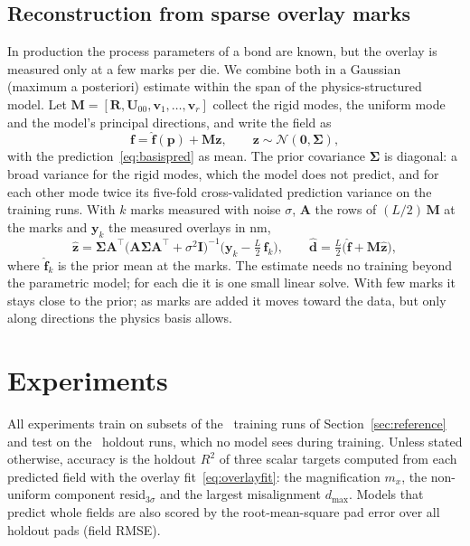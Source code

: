 \documentclass[11pt]{article}
\begin{document}
\subsection{Reconstruction from sparse overlay marks}\label{sec:marks}
In production the process parameters of a bond are known, but the overlay is measured only at a few marks per die. We
combine both in a Gaussian (maximum a posteriori) estimate within the span of the physics-structured model. Let
$\mathbf{M}=[\mathbf{R},\mathbf{U}_{00},\mathbf{v}_1,\dots,\mathbf{v}_r]$ collect the rigid modes, the uniform mode and the
model's principal directions, and write the field as
\begin{equation}
  \mathbf{f} = \hat{\mathbf{f}}(\mathbf{p}) + \mathbf{M}\mathbf{z},\qquad \mathbf{z}\sim\mathcal{N}(\mathbf{0},\boldsymbol\Sigma),
\end{equation}
with the prediction~\eqref{eq:basispred} as mean. The prior covariance $\boldsymbol\Sigma$ is diagonal: a broad
variance for the rigid modes, which the model does not predict, and for each other mode twice its five-fold
cross-validated prediction variance on the training runs. With $k$ marks measured with noise $\sigma$, $\mathbf{A}$ the
rows of $(L/2)\,\mathbf{M}$ at the marks and $\mathbf{y}_k$ the measured overlays in nm,
\begin{equation}\label{eq:map}
  \hat{\mathbf{z}} = \boldsymbol\Sigma\mathbf{A}^{\top}\bigl(\mathbf{A}\boldsymbol\Sigma\mathbf{A}^{\top}+\sigma^2\mathbf{I}\bigr)^{-1}
                     \bigl(\mathbf{y}_k-\tfrac{L}{2}\,\hat{\mathbf{f}}_k\bigr),\qquad
  \hat{\mathbf{d}} = \tfrac{L}{2}\bigl(\hat{\mathbf{f}}+\mathbf{M}\hat{\mathbf{z}}\bigr),
\end{equation}
where $\hat{\mathbf{f}}_k$ is the prior mean at the marks. The estimate needs no training beyond the parametric model;
for each die it is one small linear solve. With few marks it stays close to the prior; as marks are added it moves
toward the data, but only along directions the physics basis allows.

\section{Experiments}\label{sec:experiments}
All experiments train on subsets of the \NTrainRuns~training runs of Section~\ref{sec:reference} and test on the
\NHoldoutRuns~holdout runs, which no model sees during training. Unless stated otherwise, accuracy is the holdout $R^2$
of three scalar targets computed from each predicted field with the overlay fit~\eqref{eq:overlayfit}: the
magnification $m_x$, the non-uniform component $\mathrm{resid}_{3\sigma}$ and the largest misalignment $d_{\max}$.
Models that predict whole fields are also scored by the root-mean-square pad error over all holdout pads (field RMSE).
\end{document}
